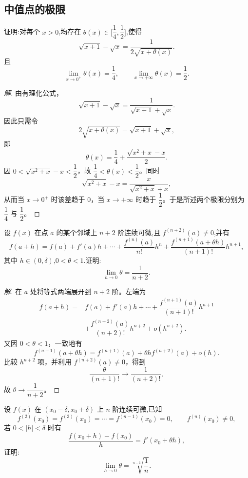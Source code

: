 \documentclass[../../数学分析培优讲义(答案版).tex]{subfiles}
\begin{document}
\subsection{中值点的极限}

\begin{example}
证明:对每个 $x>0$,均存在 $\theta(x)\in\lbrack \dfrac{1}{4},\dfrac{1}{2}\rbrack$,使得
\[
    \sqrt{x+1}-\sqrt{x}=\dfrac{1}{2\sqrt{x+\theta(x)}}.
\]
且
\[
    \lim\limits_{x\to0^+}\theta(x)=\dfrac{1}{4},
    \qquad
    \lim\limits_{x\to+\infty}\theta(x)=\dfrac{1}{2}.
\]
\end{example}

\begin{proof}[解]
由有理化公式，
\[
    \sqrt{x+1}-\sqrt{x}
    =\dfrac{1}{\sqrt{x+1}+\sqrt{x}}.
\]
因此只需令
\[
    2\sqrt{x+\theta(x)}=\sqrt{x+1}+\sqrt{x},
\]
即
\[
    \theta(x)=\dfrac{1}{4}
    +\dfrac{\sqrt{x^2+x}-x}{2}.
\]
因 $0<\sqrt{x^2+x}-x<\dfrac{1}{2}$，故 $\dfrac{1}{4}<\theta(x)<\dfrac{1}{2}$。同时
\[
    \sqrt{x^2+x}-x
    =\dfrac{x}{\sqrt{x^2+x}+x},
\]
从而当 $x\to0^+$ 时该差趋于 $0$，当 $x\to+\infty$ 时趋于 $\dfrac{1}{2}$。于是所述两个极限分别为 $\dfrac{1}{4}$ 与 $\dfrac{1}{2}$。
\end{proof}

\begin{example}
设 $f(x)$ 在点 $a$ 的某个邻域上 $n+2$ 阶连续可微,且 $f^{(n+2)}(a)\neq0$,并有
\[
    f(a+h)=f(a)+f'(a)h+\cdots+\dfrac{f^{(n)}(a)}{n!}h^n
    +\dfrac{f^{(n+1)}(a+\theta h)}{(n+1)!}h^{n+1},
\]
其中 $h\in(0,\delta)$,$0<\theta<1$.证明:
\[
    \lim\limits_{h\to0}\theta=\dfrac{1}{n+2}.
\]
\end{example}

\begin{proof}[解]
在 $a$ 处将等式两端展开到 $n+2$ 阶。左端为
\[
\begin{aligned}
    f(a+h)={}&f(a)+f'(a)h+\cdots
    +\dfrac{f^{(n+1)}(a)}{(n+1)!}h^{n+1}\\
    &+\dfrac{f^{(n+2)}(a)}{(n+2)!}h^{n+2}+o(h^{n+2}).
\end{aligned}
\]
又因 $0<\theta<1$，一致地有
\[
    f^{(n+1)}(a+\theta h)
    =f^{(n+1)}(a)+\theta h f^{(n+2)}(a)+o(h).
\]
比较 $h^{n+2}$ 项，并利用 $f^{(n+2)}(a)\neq0$，得到
\[
    \dfrac{\theta}{(n+1)!}\longrightarrow\dfrac{1}{(n+2)!},
\]
故 $\theta\to\dfrac{1}{n+2}$。
\end{proof}

\begin{example}
设 $f(x)$ 在 $(x_0-\delta,x_0+\delta)$ 上 $n$ 阶连续可微,已知
\[
    f^{(2)}(x_0)=f^{(3)}(x_0)=\cdots=f^{(n-1)}(x_0)=0,
    \qquad f^{(n)}(x_0)\neq0,
\]
若 $0<|h|<\delta$ 时有
\[
    \dfrac{f(x_0+h)-f(x_0)}{h}=f'(x_0+\theta h),
\]
证明:
\[
    \lim\limits_{h\to0}\theta
    =\sqrt[n-1]{\dfrac{1}{n}}.
\]
\end{example}
\end{document}
